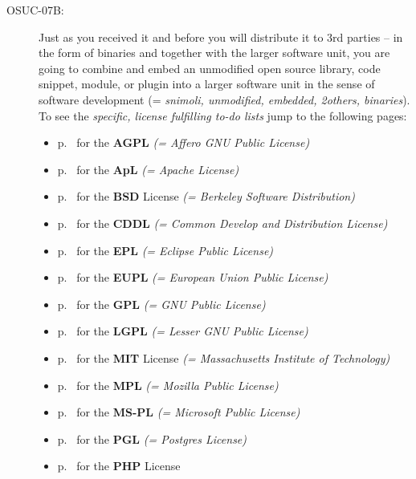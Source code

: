 \begin{description}
\item[OSUC-07B:]\label{OSUC-07B-DEF} Just as you received it and before you will
distribute it to 3rd parties -- in the form of binaries and together with the
larger software unit, you are going to combine and embed an unmodified open
source library, code snippet, module, or plugin into a larger software unit in
the sense of software development (= \textit{snimoli, unmodified, embedded,
2others, binaries}). To see the \textit{specific, license fulfilling to-do
lists} jump to the following pages:
   \begin{itemize}
    \item p.\ \pageref{OSUC-07B-AGPL} for the \textbf{AGPL}
      \textit{(= Affero GNU Public License)} 
    \item p.\ \pageref{OSUC-07B-Apache20} for the \textbf{ApL}
      \textit{(= Apache License)}
    \item p.\ \pageref{OSUC-07B-BSD} for the \textbf{BSD} License
      \textit{(= Berkeley Software Distribution)}
    \item p.\ \pageref{OSUC-07B-CDDL} for the \textbf{CDDL}
      \textit{(= Common Develop and Distribution License)}  
    \item p.\ \pageref{OSUC-07B-EPL} for the \textbf{EPL}
      \textit{(= Eclipse Public License)}     
    \item p.\ \pageref{OSUC-07B-EUPL} for the \textbf{EUPL}
      \textit{(= European Union Public License)} 
    \item p.\ \pageref{OSUC-07B-GPL} for the \textbf{GPL}
       \textit{(= GNU Public License)} 
    \item p.\ \pageref{OSUC-07B-LGPL} for the \textbf{LGPL}
      \textit{(= Lesser GNU Public License)}           
    \item p.\ \pageref{OSUC-07B-MIT} for the \textbf{MIT} License
       \textit{(= Massachusetts Institute of Technology)} 
    \item p.\ \pageref{OSUC-07B-MPL} for the \textbf{MPL}
      \textit{(= Mozilla Public License)}     
    \item p.\ \pageref{OSUC-07B-MS-PL} for the \textbf{MS-PL}
      \textit{(= Microsoft Public License)} 
    \item p.\ \pageref{OSUC-07B-PGL} for the \textbf{PGL}
      \textit{(= Postgres License)} 
    \item p.\ \pageref{OSUC-07B-PHP} for the \textbf{PHP} License 
  \end{itemize}


\end{description}
